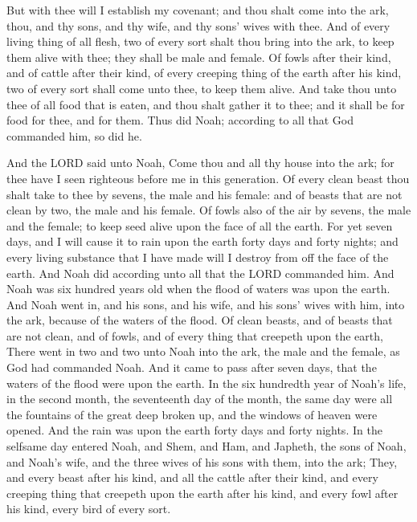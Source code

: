 \begin{biblechapter}
\verse But with thee will I establish my covenant; and thou shalt come into the ark, thou, and thy sons, and thy wife, and thy sons' wives with thee.
\verse And of every living thing of all flesh, two of every sort shalt thou bring into the ark, to keep them alive with thee; they shall be male and female.
\verse Of fowls after their kind, and of cattle after their kind, of every creeping thing of the earth after his kind, two of every sort shall come unto thee, to keep them alive.
\verse And take thou unto thee of all food that is eaten, and thou shalt gather it to thee; and it shall be for food for thee, and for them.
\verse Thus did Noah; according to all that God commanded him, so did he.
\end{biblechapter}

\begin{biblechapter} %
\verse And the LORD said unto Noah, Come thou and all thy house into the ark; for thee have I seen righteous before me in this generation.
\verse Of every clean beast thou shalt take to thee by sevens, the male and his female: and of beasts that are not clean by two, the male and his female.
\verse Of fowls also of the air by sevens, the male and the female; to keep seed alive upon the face of all the earth.
\verse For yet seven days, and I will cause it to rain upon the earth forty days and forty nights; and every living substance that I have made will I destroy from off the face of the earth.
\verse And Noah did according unto all that the LORD commanded him.
\verse And Noah was six hundred years old when the flood of waters was upon the earth.
\verse And Noah went in, and his sons, and his wife, and his sons' wives with him, into the ark, because of the waters of the flood.
\verse Of clean beasts, and of beasts that are not clean, and of fowls, and of every thing that creepeth upon the earth,
\verse There went in two and two unto Noah into the ark, the male and the female, as God had commanded Noah.
\verse And it came to pass after seven days, that the waters of the flood were upon the earth.
\verse In the six hundredth year of Noah's life, in the second month, the seventeenth day of the month, the same day were all the fountains of the great deep broken up, and the windows of heaven were opened.
\verse And the rain was upon the earth forty days and forty nights.
\verse In the selfsame day entered Noah, and Shem, and Ham, and Japheth, the sons of Noah, and Noah's wife, and the three wives of his sons with them, into the ark;
\verse They, and every beast after his kind, and all the cattle after their kind, and every creeping thing that creepeth upon the earth after his kind, and every fowl after his kind, every bird of every sort.

\end{biblechapter}
